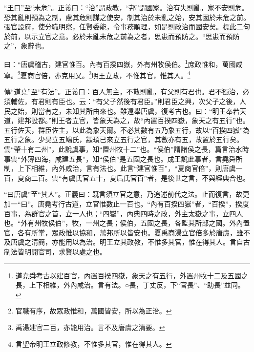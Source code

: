 {\noindent\shu{}\fzkt “王曰”至“未危”。正義曰：“治”謂政教，“邦”謂國家。治有失則亂，家不安則危。恐其亂則預為之制，慮其危則謀之使安，制其治於未亂之始，安其國於未危之前。張官設府，使分職明察，任賢委能，令事務順理，如是則政治而國安矣。標此二句於前，以示立官之意。必於未亂未危之前為之者，思患而預防之。“思患而預防之”，象辭也。 \par}

曰：“唐虞稽古，建官惟百。內有百揆四嶽，外有州牧侯伯。\footnote{道堯舜考古以建百官，內置百揆四嶽，象天之有五行，外置州牧十二及五國之長，上下相維，外內咸治。言有法。○長，丁丈反，下“官長”、“助長”並同。}庶政惟和，萬國咸寧。\footnote{官職有序，故眾政惟和，萬國皆安，所以為正治。}夏商官倍，亦克用乂。\footnote{禹湯建官二百，亦能用治。言不及唐虞之清要。}明王立政，不惟其官，惟其人。\footnote{言聖帝明王立政修教，不惟多其官，惟在得其人。}


{\noindent\zhuan{}\fzbyks 傳“道堯”至“有法”。正義曰：百人無主，不散則亂，有父則有君也。君不獨治，必須輔佐，有君則有臣也。云：“有父子然後有君臣。”則君臣之興，次父子之後，人民之始，則當有之，未知其所由來也。雖遠舉唐虞，復考古也。曰：“明王奉若天道，建邦設都。”則王者立官，皆象天為之，故“內置百揆四嶽，象天之有五行”也。五行佐天，群臣佐主，以此為象天爾。不必其數有五乃象五行，故以“百揆四嶽”為五行之象。少昊立五鳩氏，顓頊已來立五行之官，其數亦有五，故置於五行矣。雲“肇十有二州”，此說虞事，知“置州牧十二”也。“侯伯”謂諸侯之長，篇言治水時事雲“外薄四海，咸建五長”，知“侯伯”是五國之長也。成王說此事者，言堯舜所制，上下相維，內外咸治，言有法也。此言“建官惟百”，“夏商官倍”，則唐虞一百，夏商二百。雲“有虞氏官五十，夏后氏官百”者，是後世之言，不與經典合也。 \par}

{\noindent\shu{}\fzkt “曰唐虞”至“其人”。正義曰：既言須立官之意，乃追述前代之法。止而復言，故更加一“曰”。唐堯考行古道，立官惟數止一百也。“內有百揆四嶽”者，“百揆”，揆度百事，為群官之首，立一人也；“四嶽”，內典四時之政，外主太嶽之事，立四人也。“外有州牧侯伯”，牧，一州之長；侯伯，五國之長，各監其所部之國。外內置官，各有所掌，眾政惟以協和，萬邦所以皆安也。夏禹商湯立官倍多於唐虞，雖不及唐虞之清簡，亦能用以為治。明王立其政教，不惟多其官，惟在得其人。言自古制法皆明開官司，求賢以處之也。 \par}

